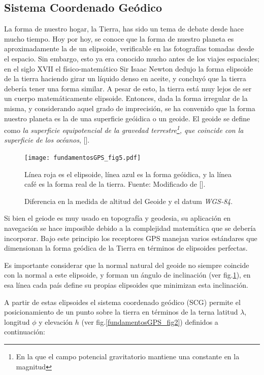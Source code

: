 \documentclass[10pt]{report}
\numberwithin{equation}{chapter}
\numberwithin{algorithm}{chapter}
\begin{document}
\subsection{Sistema Coordenado Geódico}\label{GeoCoords}
La forma de nuestro hogar, la Tierra, has sido un tema de debate desde hace mucho tiempo. Hoy por hoy, se conoce que la forma de nuestro planeta es aproximadamente la de un elipsoide, verificable en las fotografías tomadas desde el espacio. Sin embargo, esto ya era conocido mucho antes de los viajes espaciales; en el siglo XVII el físico-matemático Sir Isaac Newton dedujo la forma elipsoide de la tierra haciendo girar un líquido denso en aceite, y concluyó que la tierra debería tener una forma similar. A pesar de esto, la tierra está muy lejos de ser un cuerpo matemáticamente elipsoide. Entonces, dada la forma irregular de la misma, y considerando aquel grado de imprecisión, se ha convenido que la forma nuestro planeta es la de una superficie geóidica o un geoide. El geoide se define como \emph{la superficie equipotencial de la gravedad terrestre\footnote{En la que el campo potencial gravitatorio mantiene una constante en la magnitud}, que coincide con la superficie de los océanos}, [\cite{ASPRS1994}].\par
\begin{figure}
\begin{center}
\texttt{[image: fundamentosGPS\_fig5.pdf]}
\caption{Diferencia en la medida de altitud del Geoide y el datum \emph{WGS-84}.}
\label{fundamentosGPS_fig1}
\scriptsize{Línea roja es el elipsoide, línea azul es la forma geóidica, y la línea café es la forma real de la tierra. Fuente: Modificado de [\cite{Zogg2002}]}. 
\end{center}
\end{figure}
Si bien el geiode es muy usado en topografía y geodesia, su aplicación en navegación se hace imposible debido a la complejidad matemática que se debería incorporar. Bajo este principio los receptores GPS manejan varios estándares que dimensionan la forma geódica de la Tierra en términos de elipsoides perfectas.\par
Es importante considerar que la normal natural del geoide no siempre coincide con la normal a este elipsoide, y forman un ángulo de inclinación (ver fig.\ref{fundamentosGPS_fig1}), en esa línea cada país define su propias elipsoides que minimizan esta inclinación.\par
A partir de estas elipsoides el sistema coordenado geódico (SCG) permite el posicionamiento de un punto sobre la tierra en términos de la terna latitud $\lambda$, longitud $\phi$ y elevación $h$ (ver fig.\ref{fundamentosGPS_fig2}) definidos a continuación:
\end{document}
